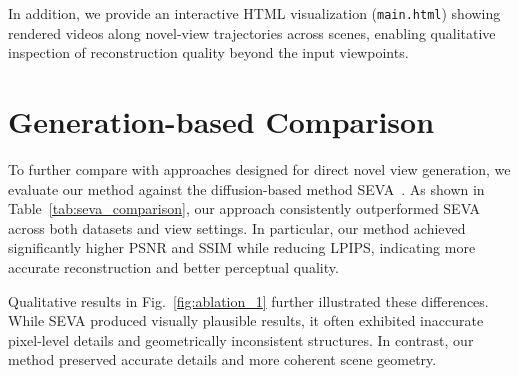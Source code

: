 \documentclass[runningheads]{llncs}
\begin{document}
In addition, we provide an interactive HTML visualization (\texttt{main.html}) showing rendered videos along novel-view trajectories across scenes, enabling qualitative inspection of reconstruction quality beyond the input viewpoints.


\section{Generation-based Comparison}
\label{sec:gen_comp}

To further compare with approaches designed for direct novel view generation, we evaluate our method against the diffusion-based method SEVA~\cite{zhou2025stable}. As shown in Table~\ref{tab:seva_comparison}, our approach consistently outperformed SEVA across both datasets and view settings. In particular, our method achieved significantly higher PSNR and SSIM while reducing LPIPS, indicating more accurate reconstruction and better perceptual quality.

Qualitative results in Fig.~\ref{fig:ablation_1} further illustrated these differences. While SEVA produced visually plausible results, it often exhibited inaccurate pixel-level details and geometrically inconsistent structures. In contrast, our method preserved accurate details and more coherent scene geometry.

\vspace{-10pt}
\end{document}
